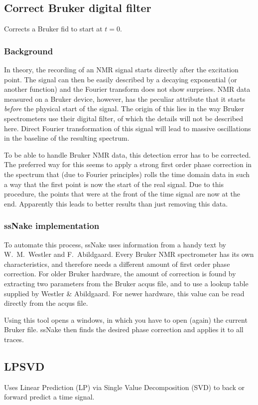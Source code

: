 \documentclass[11pt,a4paper]{article}
\begin{document}
\subsection{Correct Bruker digital filter}
Corrects a Bruker fid to start at $t=0$.

\subsubsection*{Background}
In theory, the recording of an NMR signal starts directly after the excitation point. The signal can then be easily described by a decaying exponential (or another function) and the Fourier transform does not show surprises. NMR data measured on a Bruker device, however, has the peculiar attribute that it starts \textit{before} the physical start of the signal. The origin of this lies in the way Bruker spectrometers use their digital filter, of which the details will not be described here. Direct Fourier transformation of this signal will lead to massive oscillations in the baseline of the resulting spectrum.

To be able to handle Bruker NMR data, this detection error has to be corrected. The preferred way for this seems to apply a strong first order phase correction in the spectrum that (due to Fourier principles) rolls the time domain data in such a way that the first point is now the start of the real signal. Due to this procedure, the points that were at the front of the time signal are now at the end. Apparently this leads to better results than just removing this data.

\subsubsection*{ssNake implementation}
To automate this process, ssNake uses information from a handy text by W.\ M.\ Westler and F.\ Abildgaard. Every Bruker NMR spectrometer has its own characteristics, and therefore needs a different amount of first order phase correction. For older Bruker hardware, the amount of correction is found by extracting two parameters from the Bruker acqus file, and to use a lookup table supplied by Westler \& Abildgaard. For newer hardware, this value can be read directly from the acqus file.

Using this tool opens a windows, in which you have to open (again) the current Bruker file. ssNake then finds the desired phase correction and applies it to all traces. 

\subsection{LPSVD}
Uses Linear Prediction (LP) via Single Value Decomposition (SVD) to back or forward predict a time signal.
\end{document}
